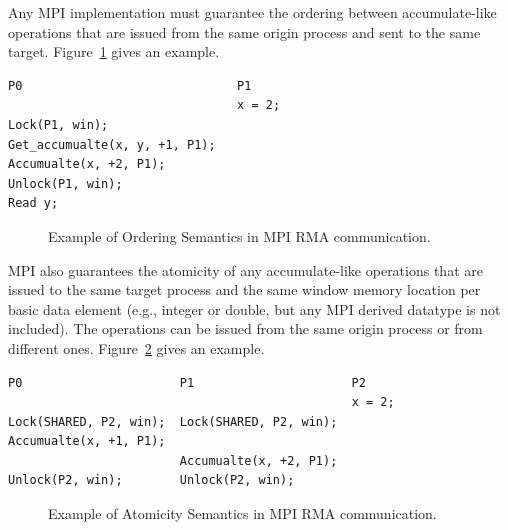 Any MPI implementation must guarantee the ordering between accumulate-like
operations that are issued from the same origin process and sent to the
same target. Figure~\ref{fig:code_rma_ordering} gives an example.

\newsavebox\mpiRmaOrdering
\begin{lrbox}{\mpiRmaOrdering}
\begin{lstlisting}[linewidth=0.7\columnwidth]
P0                              P1
                                x = 2;
Lock(P1, win);
Get_accumualte(x, y, +1, P1);
Accumualte(x, +2, P1);
Unlock(P1, win);
Read y;
\end{lstlisting}
\end{lrbox}

\begin{figure}[ht]
\centering
\vspace{2.0ex}
\usebox\mpiRmaOrdering
\caption{Example of Ordering Semantics in MPI RMA communication.}
\label{fig:code_rma_ordering}
\end{figure}

MPI also guarantees the atomicity of any accumulate-like operations
that are issued to the same target process and the same window memory
location per basic data element (e.g., integer or double, but any
MPI derived datatype is not included). The operations can be issued
from the same origin process or from different ones.
Figure~\ref{fig:code_rma_atomic} gives an example.


\newsavebox\mpiRmaAtomic
\begin{lrbox}{\mpiRmaAtomic}
\begin{lstlisting}[linewidth=1\columnwidth]
P0                      P1                      P2
                                                x = 2;
Lock(SHARED, P2, win);  Lock(SHARED, P2, win);
Accumualte(x, +1, P1);
                        Accumualte(x, +2, P1);
Unlock(P2, win);        Unlock(P2, win);
\end{lstlisting}
\end{lrbox}

\begin{figure}[ht]
\centering
\vspace{2.0ex}
\usebox\mpiRmaAtomic
\caption{Example of Atomicity Semantics in MPI RMA communication.}
\label{fig:code_rma_atomic}
\end{figure}